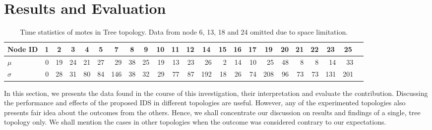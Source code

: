 \documentclass[conference,final]{IEEEtran}
\newcommand*{\bd}[1]{\multicolumn{1}{|c|}{\bfseries #1}}
\begin{document}





\section{Results and Evaluation}
\label{sec:eval}

\begin{table}[t!]
\centering
\begin{tabular}{|l|*{21}{r|}r|}
\hline
\bd{Node ID}           & \bd{1} & \bd{2} & \bd{3} & \bd{4} & \bd{5} & \bd{7} & \bd{8} & \bd{9} & \bd{10} & \bd{11} & \bd{12} & \bd{14} & \bd{15} & \bd{16} & \bd{17} & \bd{19} & \bd{20} & \bd{21} & \bd{22} & \bd{23} & \bd{25}\\
\hline
$\mu$            & 0 & 19 & 24 & 21 & 27 & 29 & 38 & 25 & 19 & 13 & 23 & 26 & 2 & 14 & 10 & 25 & 48 & 8 & 8 & 14 & 33\\
$\sigma$		 & 0 & 28 & 31 & 80 & 84 & 146 & 38 & 32 & 29 & 77 & 87 & 192 & 18 & 26 & 74 & 208 & 96 & 73 & 73 & 131 & 201\\
\hline
\end{tabular}
\caption{Time statistics of motes in Tree topology. Data from node 6, 13, 18 and 24 omitted due to space limitation.}
\label{tab:stat_ellip}
\end{table}

In this section, we presents the data found in the course of this investigation, their interpretation and evaluate the contribution.
Discussing the performance and effects of the proposed IDS in different topologies are useful.
However, any of the experimented topologies also presents fair idea about the outcomes from the others. 
Hence, we shall concentrate our discussion on results and findings of a single, tree topology only.
We shall mention the cases in other topologies when the outcome was considered contrary to our expectations.
\end{document}
